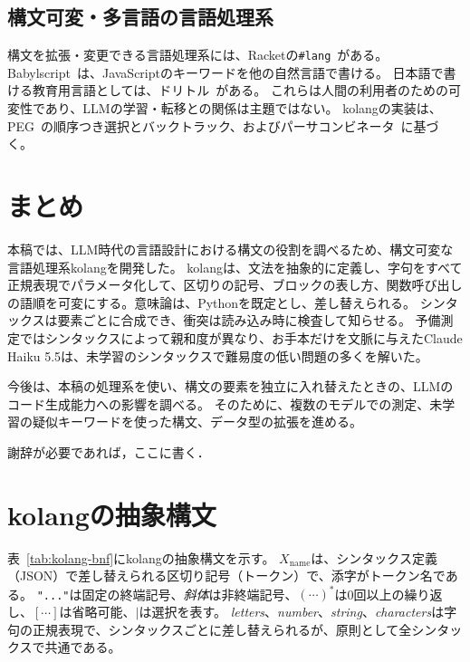 \documentclass{ipsjprosym}
\begin{document}
\subsection{構文可変・多言語の言語処理系}

構文を拡張・変更できる言語処理系には、Racketの\verb|#lang|~\cite{Tobin2011Libraries}がある。
Babylscript~\cite{Iu2011Babylscript}は、JavaScriptのキーワードを他の自然言語で書ける。
日本語で書ける教育用言語としては、ドリトル~\cite{Kanemune2001Dolittle}がある。
これらは人間の利用者のための可変性であり、LLMの学習・転移との関係は主題ではない。
kolangの実装は、PEG~\cite{Ford2004PEG,Kuramitsu2016Nez}の順序つき選択とバックトラック、およびパーサコンビネータ~\cite{Hutton1998Monadic}に基づく。

\section{まとめ}

本稿では、LLM時代の言語設計における構文の役割を調べるため、構文可変な言語処理系kolangを開発した。
kolangは、文法を抽象的に定義し、字句をすべて正規表現でパラメータ化して、区切りの記号、ブロックの表し方、関数呼び出しの語順を可変にする。意味論は、Pythonを既定とし、差し替えられる。
シンタックスは要素ごとに合成でき、衝突は読み込み時に検査して知らせる。
予備測定ではシンタックスによって親和度が異なり、お手本だけを文脈に与えたClaude Haiku 5.5は、未学習のシンタックスで難易度の低い問題の多くを解いた。

今後は、本稿の処理系を使い、構文の要素を独立に入れ替えたときの、LLMのコード生成能力への影響を調べる。
そのために、複数のモデルでの測定、未学習の疑似キーワードを使った構文、データ型の拡張を進める。

\begin{acknowledgment}
謝辞が必要であれば，ここに書く．
\end{acknowledgment}




\appendix

\section{kolangの抽象構文}
\label{app:syntax}

表~\ref{tab:kolang-bnf}にkolangの抽象構文を示す。
$X_{\mathrm{name}}$は、シンタックス定義（JSON）で差し替えられる区切り記号（トークン）で、添字がトークン名である。
\texttt{"..."}は固定の終端記号、\textit{斜体}は非終端記号、$(\cdots)^{*}$は0回以上の繰り返し、$[\cdots]$は省略可能、$\mid$は選択を表す。
\textit{letters}、\textit{number}、\textit{string}、\textit{characters}は字句の正規表現で、シンタックスごとに差し替えられるが、原則として全シンタックスで共通である。
\end{document}
